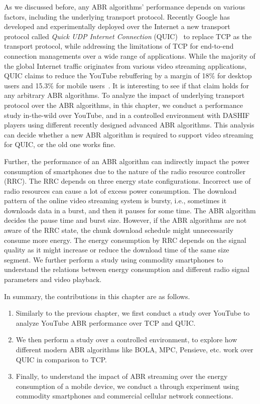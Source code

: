 As we discussed before, any ABR algorithms' performance depends on various factors, including the underlying transport protocol. 
Recently Google has developed and experimentally deployed over the Internet a new transport protocol called \textit{Quick UDP Internet Connection} (QUIC)~\cite{langley2017quic} to replace TCP as the transport protocol, while addressing the limitations of TCP for end-to-end connection managements over a wide range of applications. While the majority of the global Internet traffic originates from various video streaming applications, QUIC claims to reduce the YouTube rebuffering by a margin of 18\% for desktop users and 15.3\% for mobile users~\cite{langley2017quic}.  It is interesting to see if that claim holds for any arbitrary ABR algorithms. To analyze the impact of underlying transport protocol over the ABR algorithms, in this chapter, we conduct a performance study in-the-wild over YouTube, and in a controlled environment with DASHIF players using different recently designed advanced ABR algorithms. This analysis can decide whether a new ABR algorithm is required to support video streaming for QUIC, or the old one works fine.

Further, the performance of an ABR algorithm can indirectly impact the power consumption of smartphones due to the nature of the radio resource controller (RRC). The RRC depends on three energy state configurations. Incorrect use of radio resources can cause a lot of excess power consumption. The download pattern of the online video streaming system is bursty, i.e., sometimes it downloads data in a burst, and then it pauses for some time. The ABR algorithm decides the pause time and burst size. However, if the ABR algorithms are not aware of the RRC state, the chunk download schedule might unnecessarily consume more energy. The energy consumption by RRC depends on the signal quality as it might increase or reduce the download time of the same size segment. We further perform a study using commodity smartphones to understand the relations between energy consumption and different radio signal parameters and video playback. 

In summary, the contributions in this chapter are as follows. 
\begin{enumerate}
	\item Similarly to the previous chapter, we first conduct a study over YouTube to analyze YouTube ABR performance over TCP and QUIC. 
	\item We then perform a study over a controlled environment, to explore how different modern ABR algorithms like BOLA, MPC, Pensieve, etc. work over QUIC in comparison to TCP. 
	\item Finally, to understand the impact of ABR streaming over the energy consumption of a mobile device, we conduct a through experiment using commodity smartphones and commercial cellular network connections. 
\end{enumerate}

